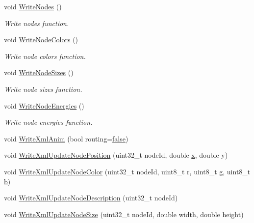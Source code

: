 \begin{DoxyCompactItemize}
void \hyperlink{classns3_1_1AnimationInterface_abf98081f1a5ff14401187b5e135aa6a9}{Write\+Nodes} ()
\begin{DoxyCompactList}\small\item\em Write nodes function. \end{DoxyCompactList}\item 
void \hyperlink{classns3_1_1AnimationInterface_ac5c5f326ca346e340a0a3e9ec50d94ee}{Write\+Node\+Colors} ()
\begin{DoxyCompactList}\small\item\em Write node colors function. \end{DoxyCompactList}\item 
void \hyperlink{classns3_1_1AnimationInterface_a085198bcb57441ab8d46790e5dccf2e3}{Write\+Node\+Sizes} ()
\begin{DoxyCompactList}\small\item\em Write node sizes function. \end{DoxyCompactList}\item 
void \hyperlink{classns3_1_1AnimationInterface_a8a7475d05d49943291911223cc4d4276}{Write\+Node\+Energies} ()
\begin{DoxyCompactList}\small\item\em Write node energies function. \end{DoxyCompactList}\item 
void \hyperlink{classns3_1_1AnimationInterface_a85f0c329f436169ad81b3a861b66e65b}{Write\+Xml\+Anim} (bool routing=\hyperlink{lte__cqi__generation_8m_ab1bef239d413c4da139c4bac92cd657a}{false})
\item 
void \hyperlink{classns3_1_1AnimationInterface_aecbb0a0c0f818ad72b78e164bb6549dc}{Write\+Xml\+Update\+Node\+Position} (uint32\+\_\+t node\+Id, double \hyperlink{lte__link__budget__x2__handover__measures_8m_a9336ebf25087d91c818ee6e9ec29f8c1}{x}, double y)
\item 
void \hyperlink{classns3_1_1AnimationInterface_ab6d84fe55ce16113db56ddb81a4054fa}{Write\+Xml\+Update\+Node\+Color} (uint32\+\_\+t node\+Id, uint8\+\_\+t r, uint8\+\_\+t \hyperlink{loss__OH__suburban_8m_a6182af7c15da7a804d8d96b71bcd5ab7}{g}, uint8\+\_\+t \hyperlink{lte__pathloss_8m_a21ad0bd836b90d08f4cf640b4c298e7c}{b})
\item 
void \hyperlink{classns3_1_1AnimationInterface_a8f76a390d9011d2effb215d5a4b25490}{Write\+Xml\+Update\+Node\+Description} (uint32\+\_\+t node\+Id)
\item 
void \hyperlink{classns3_1_1AnimationInterface_ad569ecd3c31c8bf1cd99098165b702b2}{Write\+Xml\+Update\+Node\+Size} (uint32\+\_\+t node\+Id, double width, double height)

\end{DoxyCompactItemize}
